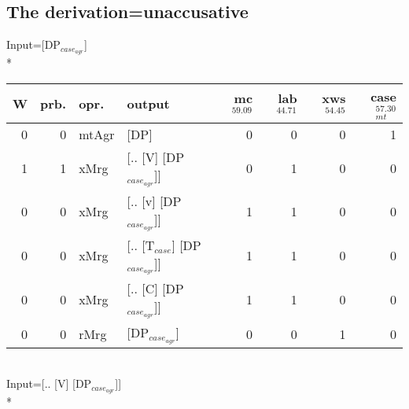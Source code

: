 \subsection{The derivation=unaccusative}
\begingroup\scriptsize Input=[DP$_{case_{agr}}$]\\*
\begin{tabularx}{\linewidth}{rrlXrrrr}
\hline
   W &   prb. & opr.    & output                      &   mc$^{59.09}$ &   lab$^{44.71}$ &   xws$^{54.45}$ &   case$_{mt}^{57.30}$ \\
\hline
   0 &   0 & mtAgr & [DP]                        &            0 &             0 &             0 &                 1 \\
   1 &   1 & xMrg  & [.. [V] [DP$_{case_{agr}}$]]      &            0 &             1 &             0 &                 0 \\
   0 &   0 & xMrg  & [.. [v] [DP$_{case_{agr}}$]]      &            1 &             1 &             0 &                 0 \\
   0 &   0 & xMrg  & [.. [T$_{case}$] [DP$_{case_{agr}}$]] &            1 &             1 &             0 &                 0 \\
   0 &   0 & xMrg  & [.. [C] [DP$_{case_{agr}}$]]      &            1 &             1 &             0 &                 0 \\
   0 &   0 & rMrg  & [DP$_{case_{agr}}$]               &            0 &             0 &             1 &                 0 \\
\hline
\end{tabularx}\endgroup\\
\begingroup\scriptsize Input=[.. [V] [DP$_{case_{agr}}$]]\\*
